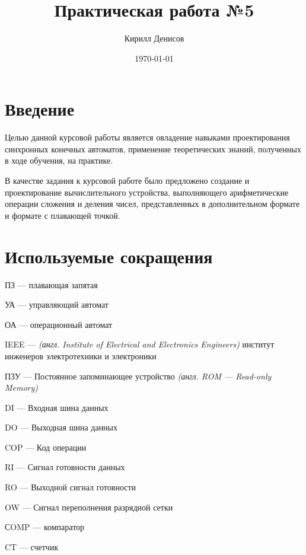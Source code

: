 \documentclass[a4paper,14pt]{extarticle}
\author{Кирилл Денисов}
\title{Практическая работа №5}
\date{\today}
\begin{document}
	
	\def\contentsname{ОГЛАВЛЕНИЕ}
	\setcounter{page}{3} %
	\tableofcontents
	\listoffigures
	\listoftables


	
\begin{center}
	\newpage
\end{center}

\section {Введение}
Целью данной курсовой работы является овладение навыками проектирования синхронных конечных автоматов, применение теоретических знаний, полученных в ходе обучения,  на практике.

В качестве задания к курсовой работе было предложено создание и проектирование вычислительного устройства, выполняющего арифметические операции сложения и деления чисел, представленных в дополнительном формате и формате с плавающей точкой.

\section {Используемые сокращения}
ПЗ --- плавающая запятая

УА --- управляющий автомат

ОА --- операционный автомат

IEEE --- \textit{(англ. Institute of Electrical and Electronics Engineers)} институт инженеров электротехники и электроники

ПЗУ --- Постоянное запоминающее устройство \textit{(англ. ROM --- Read-only Memory)}

DI			---	Входная шина данных

 DO		---	Выходная шина данных
 
 COP		---	Код операции
 
 RI			---	Сигнал готовности данных
 
 RO		---	Выходной сигнал готовности
 
 OW		---	Сигнал переполнения разрядной сетки
 
 СOMP		---	компаратор
 
 CT			---	счетчик
 
\end{document}

